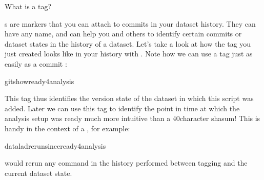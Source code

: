 \ignorespaces \begin{findoutmore}[label={fom-what-is-a-tag}, before title={\thetcbcounter\ }, float, floatplacement=tb, check odd page=true]{What is a tag?}
\label{\detokenize{basics/101-130-yodaproject:fom-what-is-a-tag}}

\sphinxAtStartPar
{\hyperref[\detokenize{glossary:term-tag}]{}}s are markers that you can attach to commits in your dataset history.
They can have any name, and can help you and others to identify certain commits
or dataset states in the history of a dataset. Let’s take a look at how the tag
you just created looks like in your history with .
Note how we can use a tag just as easily as a commit {\hyperref[\detokenize{glossary:term-shasum}]{}}:

\begin{sphinxVerbatim}[commandchars=\\\{\}]
gitshowready4analysis


\end{sphinxVerbatim}

\sphinxAtStartPar
This tag thus identifies the version state of the dataset in which this script
was added.
Later we can use this tag to identify the point in time at which
the analysis setup was ready \textendash{} much more intuitive than a 40\sphinxhyphen{}character shasum!
This is handy in the context of a , for example:

\begin{sphinxVerbatim}[commandchars=\\\{\}]
dataladrerun\PYGZhy{}\PYGZhy{}sinceready4analysis
\end{sphinxVerbatim}

\sphinxAtStartPar
would rerun any  command in the history performed between tagging
and the current dataset state.


\end{findoutmore}

